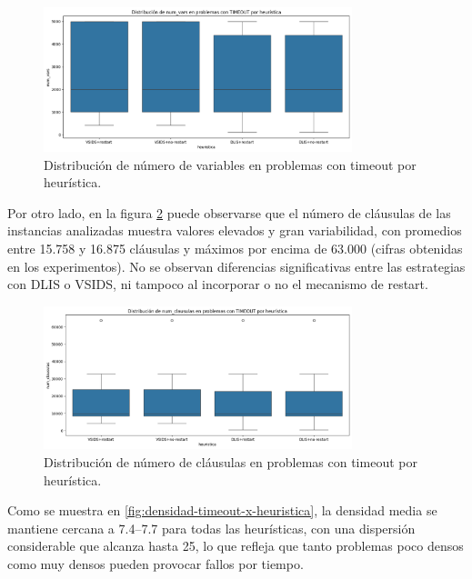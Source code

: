 \begin{figure}[ht]
    \centering
    \includegraphics[width=0.8\textwidth]{Graphics/num_vars_timeout_x_heuristica.png}
    \caption{Distribuci\'on de n\'umero de variables en problemas con timeout por heur\'istica.}
    \label{fig:num-vars-timeout-x-heuristica}
\end{figure}

Por otro lado, en la figura \ref{fig:num-claus-timeout-x-heuristica} puede observarse que el n\'umero de cl\'ausulas de las instancias analizadas muestra valores elevados y gran variabilidad, con promedios entre 15.758 y 16.875 cl\'ausulas y m\'aximos por encima de 63.000 (cifras obtenidas en los experimentos). No se observan diferencias significativas entre las estrategias con DLIS o VSIDS, ni tampoco al incorporar o no el mecanismo de restart.

\begin{figure}[ht]
    \centering
    \includegraphics[width=0.8\textwidth]{Graphics/num_claus_timeout_x_heuristica.png}
    \caption{Distribuci\'on de n\'umero de cl\'ausulas en problemas con timeout por heur\'istica.}
    \label{fig:num-claus-timeout-x-heuristica}
\end{figure}

Como se muestra en \ref{fig:densidad-timeout-x-heuristica}, la densidad media se mantiene cercana a 7.4–7.7 para todas las heurísticas, con una dispersión considerable que alcanza hasta 25, lo que refleja que tanto problemas poco densos como muy densos pueden provocar fallos por tiempo.

